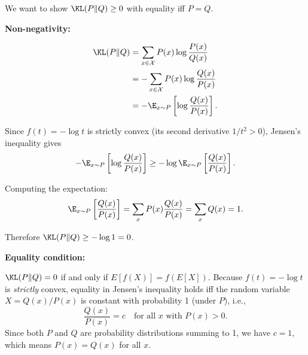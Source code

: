 \begin{answer}
We want to show $\KL(P\|Q) \geq 0$ with equality iff $P = Q$.

\textbf{Non-negativity:}

\begin{align*}
\KL(P\|Q) &= \sum_{x \in \mathcal{X}} P(x) \log \frac{P(x)}{Q(x)} \\
&= -\sum_{x \in \mathcal{X}} P(x) \log \frac{Q(x)}{P(x)} \\
&= -\E_{x \sim P}\left[\log \frac{Q(x)}{P(x)}\right].
\end{align*}

Since $f(t) = -\log t$ is strictly convex (its second derivative $1/t^2 > 0$), Jensen's inequality gives
$$-\E_{x \sim P}\left[\log \frac{Q(x)}{P(x)}\right] \geq -\log \E_{x \sim P}\left[\frac{Q(x)}{P(x)}\right].$$

Computing the expectation:
$$\E_{x \sim P}\left[\frac{Q(x)}{P(x)}\right] = \sum_{x} P(x) \frac{Q(x)}{P(x)} = \sum_x Q(x) = 1.$$

Therefore $\KL(P\|Q) \geq -\log 1 = 0$.

\textbf{Equality condition:}

$\KL(P\|Q) = 0$ if and only if $E[f(X)] = f(E[X])$. Because $f(t) = -\log t$ is \emph{strictly} convex, equality in Jensen's inequality holds iff the random variable $X = Q(x)/P(x)$ is constant with probability 1 (under $P$), i.e.,
$$\frac{Q(x)}{P(x)} = c \quad \text{for all } x \text{ with } P(x) > 0.$$
Since both $P$ and $Q$ are probability distributions summing to 1, we have $c = 1$, which means $P(x) = Q(x)$ for all $x$.
\end{answer}
